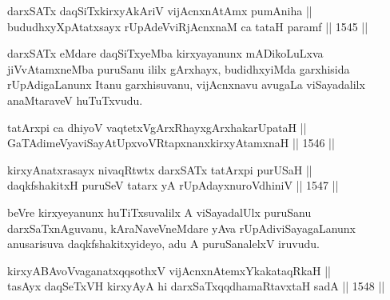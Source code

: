 
\begin{shl}
darxSATx daqSiTxkirxyAkAriV vijAcnxnAtAmx pumAniha || \\
bududhxyXpAtatxsayx rUpAdeVviRjAcnxnaM ca tataH paramf ||  1545 ||  
\end{shl}

\begin{artha}
darxSATx eMdare daqSiTxyeMba kirxyayanunx mADikoLuLxva jiVvAtamxneMba puruSanu ililx gArxhayx, budidhxyiMda garxhisida rUpAdigaLanunx Itanu garxhisuvanu, vijAcnxnavu avugaLa viSayadalilx anaMtaraveV huTuTxvudu.
\end{artha}

\begin{shl}
tatArxpi ca dhiyoV vaqtetxVgArxRhayxgArxhakarUpataH || \\
GaTAdimeVyaviSayAtUpxvoVRtapxnanxkirxyAtamxnaH ||  1546 ||  
\end{shl}



\begin{shl}
kirxyAnatxrasayx nivaqRtwtx darxSATx tatArxpi purUSaH || \\
daqkfshakitxH puruSeV tatarx yA rUpAdayxnuroVdhiniV ||  1547 ||  
\end{shl}

\begin{artha}
beVre kirxyeyanunx huTiTxsuvalilx A viSayadalUlx puruSanu darxSaTxnAguvanu, kAraNaveVneMdare yAva rUpAdiviSayagaLanunx anusarisuva daqkfshakitxyideyo, adu A puruSanalelxV iruvudu.
\end{artha}



\begin{shl}
\footnotemark[1]kirxyABAvoV\s vaganatxqqsothxV vijAcnxnAtemxYkakataqRkaH || \\
tasAyx daqSeTxVH kirxyAyA hi darxSaTxqqdhamaRtavxtaH sadA ||  1548 ||  
\end{shl}
				
